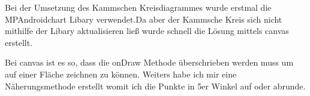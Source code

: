 Bei der Umsetzung des Kammschen Kreisdiagrammes wurde erstmal die MPAndroidchart Libary verwendet.Da aber der Kammsche Kreis sich nicht mithilfe der Libary aktualisieren ließ wurde schnell die Lösung mittels canvas erstellt. 

Bei canvas ist es so, dass die onDraw Methode überschrieben werden muss um auf einer Fläche zeichnen zu können. Weiters habe ich mir eine Näherungsmethode erstellt womit ich die Punkte in 5er Winkel auf oder abrunde.






